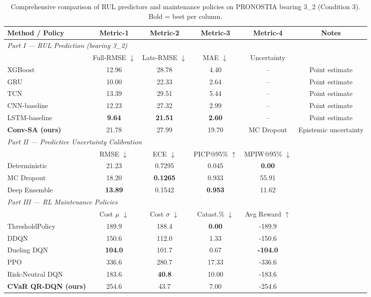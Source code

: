 \begin{table}[t]
\centering
\caption{Comprehensive comparison of RUL predictors and maintenance policies on PRONOSTIA bearing 3\_2 (Condition 3). Bold = best per column.}
\label{tab:master}
\setlength{\tabcolsep}{5pt}
\begin{tabular}{l c c c c c}
\toprule
Method / Policy & Metric-1 & Metric-2 & Metric-3 & Metric-4 & Notes \\
\midrule
\multicolumn{6}{l}{\textit{Part I — RUL Prediction (bearing 3\_2)}} \\
\midrule
\quad & Full-RMSE $\downarrow$ & Late-RMSE $\downarrow$ & MAE $\downarrow$ & Uncertainty & \\
XGBoost & 12.96 & 28.78 & 4.40 & -- & Point estimate \\
GRU & 10.00 & 22.33 & 2.64 & -- & Point estimate \\
TCN & 13.39 & 29.51 & 5.44 & -- & Point estimate \\
CNN-baseline & 12.23 & 27.32 & 2.99 & -- & Point estimate \\
LSTM-baseline & \textbf{9.64} & \textbf{21.51} & \textbf{2.60} & -- & Point estimate \\
\textbf{Conv-SA (ours)} & 21.78 & 27.99 & 19.70 & MC Dropout & Epistemic uncertainty \\
\midrule
\multicolumn{6}{l}{\textit{Part II — Predictive Uncertainty Calibration}} \\
\midrule
\quad & RMSE $\downarrow$ & ECE $\downarrow$ & PICP@95\% $\uparrow$ & MPIW@95\% $\downarrow$ & \\
Deterministic & 21.23 & 0.7295 & 0.045 & \textbf{0.00} & \\
MC Dropout & 18.20 & \textbf{0.1265} & 0.933 & 55.91 & \\
Deep Ensemble & \textbf{13.89} & 0.1542 & \textbf{0.953} & 11.62 & \\
\midrule
\multicolumn{6}{l}{\textit{Part III — RL Maintenance Policies}} \\
\midrule
\quad & Cost $\mu$ $\downarrow$ & Cost $\sigma$ $\downarrow$ & Catast.\% $\downarrow$ & Avg Reward $\uparrow$ & \\
ThresholdPolicy & 189.9 & 188.4 & \textbf{0.00} & -189.9 & \\
DDQN & 150.6 & 112.0 & 1.33 & -150.6 & \\
Dueling DQN & \textbf{104.0} & 101.7 & 0.67 & \textbf{-104.0} & \\
PPO & 336.6 & 280.7 & 17.33 & -336.6 & \\
Risk-Neutral DQN & 183.6 & \textbf{40.8} & 10.00 & -183.6 & \\
\textbf{CVaR QR-DQN (ours)} & 254.6 & 43.7 & 7.00 & -254.6 & \\
\bottomrule
\end{tabular}
\end{table}
